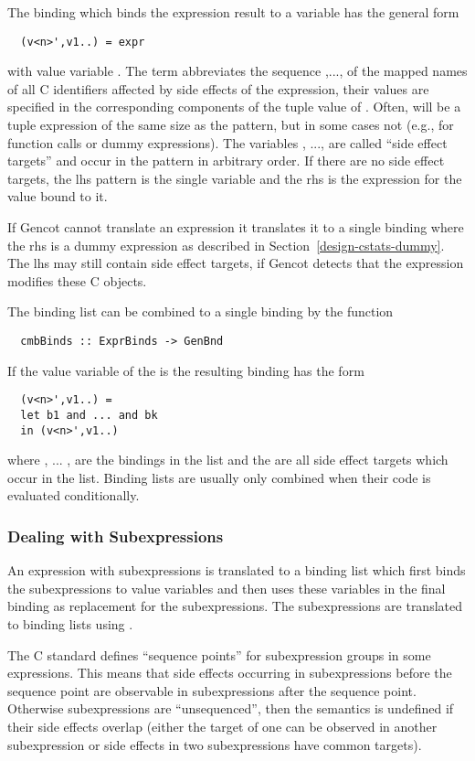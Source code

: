 The binding which binds the expression result to a variable has the general form
\begin{verbatim}
  (v<n>',v1..) = expr
\end{verbatim}
with value variable . The term  abbreviates
the sequence ,..., of the mapped names of all C identifiers affected by side effects of the expression, their values
are specified in the corresponding components of the tuple value of . Often,  will be a tuple 
expression of the same size as the pattern, but in some cases not (e.g., for function calls or dummy expressions). 
The variables , ...,  are called ``side effect targets'' and occur in the pattern in arbitrary order.
If there are no side effect targets, the lhs pattern is the single variable  and the rhs is the expression for
the value bound to it.

If Gencot cannot translate an expression it translates it to a single binding where the rhs is a dummy expression as described in 
Section~\ref{design-cstats-dummy}. The lhs may still contain side effect targets, if Gencot detects that the expression
modifies these C objects.

The binding list can be combined to a single binding by the function
\begin{verbatim}
  cmbBinds :: ExprBinds -> GenBnd
\end{verbatim}
If the value variable of the  is  the resulting binding has the form
\begin{verbatim}
  (v<n>',v1..) = 
  let b1 and ... and bk
  in (v<n>',v1..)
\end{verbatim}
where , ... ,  are the bindings in the list and the  are all side
effect targets which occur in the list. Binding lists are usually only combined when their code is evaluated conditionally.

\subsubsection{Dealing with Subexpressions}

An expression with subexpressions is translated to a binding list which first binds the subexpressions to value
variables and then uses these variables in the final binding as replacement for the subexpressions. The subexpressions
are translated to binding lists using .

The C standard defines ``sequence points'' for subexpression groups in some expressions. This means that side effects 
occurring in subexpressions before the sequence point are observable in subexpressions after the sequence point. Otherwise
subexpressions are ``unsequenced'', then the semantics is undefined if their side effects overlap (either the target of 
one can be observed in another subexpression or side effects in two subexpressions have common targets). 

